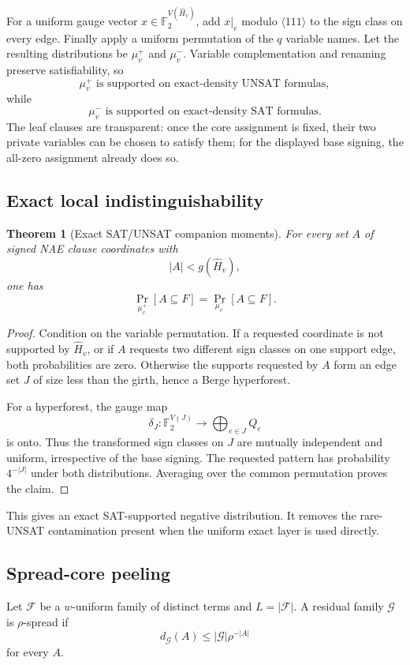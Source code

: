 \documentclass[11pt]{article}
\newtheorem{theorem}{Theorem}
\begin{document}
For a uniform gauge vector $x\in\mathbb F_2^{V(\widehat H_v)}$, add $x|_e$ modulo $\langle111\rangle$ to the sign class on every edge. Finally apply a uniform permutation of the $q$ variable names. Let the resulting distributions be $\mu_v^+$ and $\mu_v^-$. Variable complementation and renaming preserve satisfiability, so
\[
\mu_v^+\text{ is supported on exact-density UNSAT formulas},
\]
while
\[
\mu_v^-\text{ is supported on exact-density SAT formulas}.
\]
The leaf clauses are transparent: once the core assignment is fixed, their two private variables can be chosen to satisfy them; for the displayed base signing, the all-zero assignment already does so.

\subsection{Exact local indistinguishability}
\begin{theorem}[Exact SAT/UNSAT companion moments]
For every set $A$ of signed NAE clause coordinates with
\[
|A|<g(\widehat H_v),
\]
one has
\[
\boxed{\Pr_{\mu_v^+}[A\subseteq F]=\Pr_{\mu_v^-}[A\subseteq F].}
\]
\end{theorem}
\begin{proof}
Condition on the variable permutation. If a requested coordinate is not supported by $\widehat H_v$, or if $A$ requests two different sign classes on one support edge, both probabilities are zero. Otherwise the supports requested by $A$ form an edge set $J$ of size less than the girth, hence a Berge hyperforest.

For a hyperforest, the gauge map
\[
\delta_J:\mathbb F_2^{V(J)}\to\bigoplus_{e\in J}Q_e
\]
is onto. Thus the transformed sign classes on $J$ are mutually independent and uniform, irrespective of the base signing. The requested pattern has probability $4^{-|J|}$ under both distributions. Averaging over the common permutation proves the claim.
\end{proof}

This gives an exact SAT-supported negative distribution. It removes the rare-UNSAT contamination present when the uniform exact layer is used directly.

\subsection{Spread-core peeling}
Let $\mathcal F$ be a $w$-uniform family of distinct terms and $L=|\mathcal F|$. A residual family $\mathcal G$ is $\rho$-spread if
\[
d_{\mathcal G}(A)\le |\mathcal G|\rho^{-|A|}
\]
for every $A$.
\end{document}
